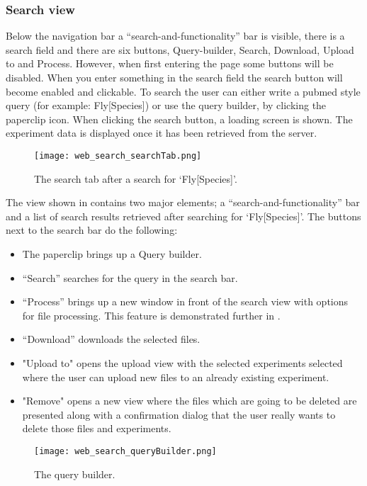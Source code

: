 \subsubsection{Search view}

Below the navigation bar a “search-and-functionality” bar is visible, there is a search field and there are six buttons, Query-builder, Search, Download, Upload to and Process. However, when first entering the page some buttons will be disabled. When you enter something in the search field the search button will become enabled and clickable. To search the user can either write a pubmed style query (for example: Fly[Species]) or use the query builder, by clicking the paperclip icon. When clicking the search button, a loading screen is shown. The experiment data is displayed once it has been retrieved from the server.
\begin{figure}[h]
\centering
\texttt{[image: web\_search\_searchTab.png]}
\caption{\label{fig:web_search_searchTab}The search tab after a search for ‘Fly[Species]’.}
\end{figure}

The view shown in  contains two major elements; a “search-and-functionality” bar and a list of search results retrieved after searching for ‘Fly[Species]’. The buttons next to the search bar do the following: 
\begin{itemize}
	\item The paperclip brings up a Query builder.
	\item “Search” searches for the query in the search bar. 
	\item “Process” brings up a new window in front of the search view with options for file processing. This feature is demonstrated further in .
    \item “Download” downloads the selected files. 
    \item "Upload to" opens the upload view with the selected experiments selected where the user can upload new files to an already existing experiment.
    \item "Remove" opens a new view where the files which are going to be deleted are presented along with a confirmation dialog that the user really wants to delete those files and experiments.
\end{itemize}

\begin{figure}[h]
\centering
\texttt{[image: web\_search\_queryBuilder.png]}
\caption{\label{fig:web_search_queryBuilder}The query builder.}
\end{figure}

